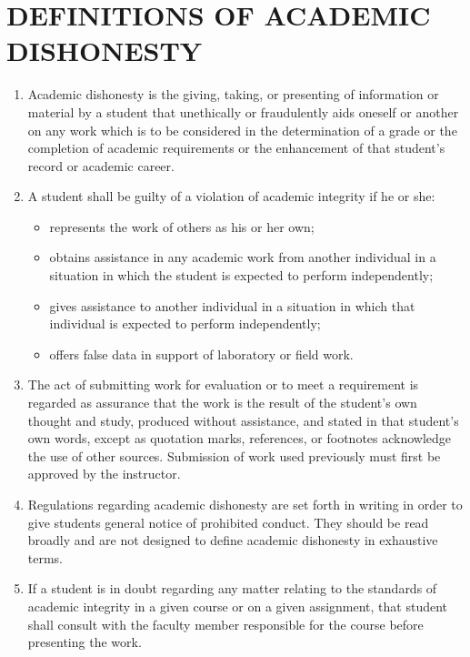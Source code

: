\documentclass{article}%
\begin{document}
\section*{DEFINITIONS OF ACADEMIC DISHONESTY}
\begin{enumerate}
\item Academic dishonesty is the giving, taking, or presenting of information or material by a student that unethically or fraudulently aids oneself or another on any work which is to be considered in the determination of a grade or the completion of academic requirements or the enhancement of that student's record or academic career.

\item A student shall be guilty of a violation of academic integrity if he or she:
\begin{itemize}
\item represents the work of others as his or her own;
\item obtains assistance in any academic work from another individual in a situation in which the student is expected to perform independently;
\item gives assistance to another individual in a situation in which that individual is expected to perform independently;
\item offers false data in support of laboratory or field work.
\end{itemize}
\item The act of submitting work for evaluation or to meet a requirement is regarded as assurance that the work is the result of the student's own thought and study, produced without assistance, and stated in that student's own words, except as quotation marks, references, or footnotes acknowledge the use of other sources. Submission of work used previously must first be approved by the instructor.

\item Regulations regarding academic dishonesty are set forth in writing in order to give students general notice of prohibited conduct. They should be read broadly and are not designed to define academic dishonesty in exhaustive terms.

\item If a student is in doubt regarding any matter relating to the standards of academic integrity in a given course or on a given assignment, that student shall consult with the faculty member responsible for the course before presenting the work.
\end{enumerate}
\end{document}
